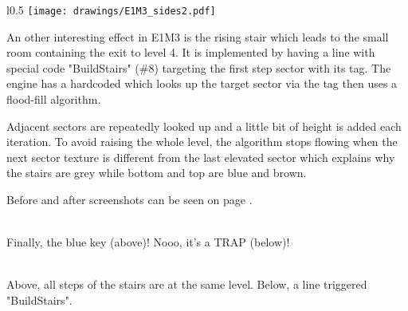 \par
\begin{wrapfigure}[23]{l}{0.5\textwidth}
\centering
\texttt{[image: drawings/E1M3\_sides2.pdf]}
\end{wrapfigure}
An other interesting effect in E1M3 is the rising stair which leads to the small room containing the exit to level 4. It is implemented by having a line with special code "BuildStairs" (\#8) targeting the first step sector with its tag. The engine has a hardcoded  which looks up the target sector via the tag then uses a flood-fill algorithm.\\
\par Adjacent sectors are repeatedly looked up and a little bit of height is added each iteration. To avoid raising the whole level, the algorithm stops flowing when the next sector texture is different from the last elevated sector which explains why the stairs are grey while bottom and top are blue and brown.\\
\par
Before and after screenshots can be seen on page \pageref{stairs}.

\label{e1m3_trap}
\\

Finally, the blue key (above)! Nooo, it's a TRAP (below)!

\vspace{2mm}


\\

Above, all steps of the stairs are at the same level. Below, a line triggered "BuildStairs". \label{stairs}

\vspace{2mm}













\pagebreak
